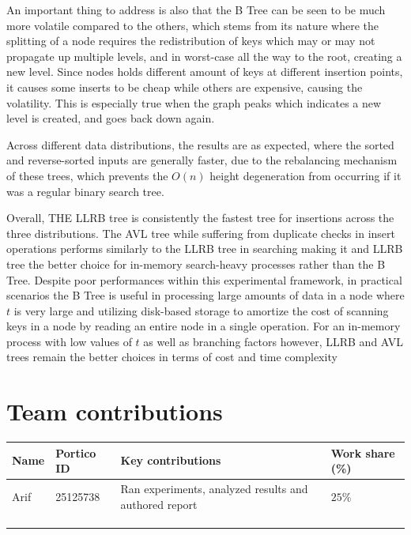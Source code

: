 \documentclass[12pt]{article}
\begin{document}
An important thing to address is also that the B Tree can be seen to be much more volatile compared to the others, which stems from its nature where the splitting of a node requires the redistribution of keys which may or may not propagate up multiple levels, and in worst-case all the way to the root, creating a new level. Since nodes holds different amount of keys at different insertion points, it causes some inserts to be cheap while others are expensive, causing the volatility. This is especially true when the graph peaks which indicates a new level is created, and goes back down again.

Across different data distributions, the results are as expected, where the sorted and reverse-sorted inputs are generally faster, due to the rebalancing mechanism of these trees, which prevents the $O (n)$ height degeneration from occurring if it was a regular binary search tree.

Overall, THE LLRB tree is consistently the fastest tree for insertions across the three distributions. The AVL tree while suffering from duplicate checks in insert operations performs similarly to the LLRB tree in searching making it and LLRB tree the better choice for in-memory search-heavy processes rather than the B Tree. Despite poor performances within this experimental framework, in practical scenarios the B Tree is useful in processing large amounts of data in a node where $t$ is very large and utilizing disk-based storage to amortize the cost of scanning keys in a node by reading an entire node in a single operation\cite{alma9931552389604761}. For an in-memory process with low values of $t$ as well as branching factors however, LLRB and AVL trees remain the better choices in terms of cost and time complexity





\section{Team contributions}


\vspace{1cm}

\begin{tabular}{|l|l|p{6cm}|l|}
\hline
{\bf Name} & {\bf Portico ID} & {\bf Key contributions} & {\bf Work share (\%)} \\[1mm]
\hline
Arif    &  25125738  & Ran experiments, analyzed results and authored report & $25\%$ \\\hline
          &            &         &          \\\hline
          &            &         &          \\\hline
          &            &         &          \\
\hline
\end{tabular}



\end{document}
